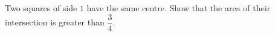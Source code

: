 Two squares of side $1$ have the same centre. Show that the area of their intersection is greater than $\dfrac34$.
